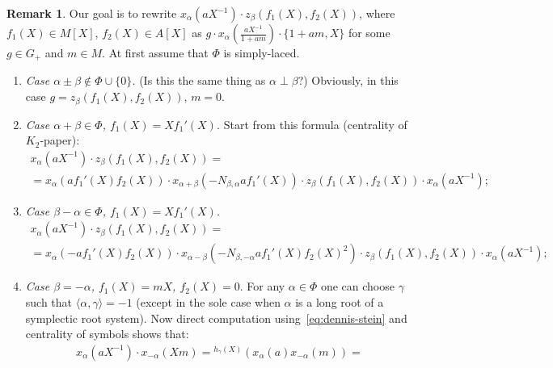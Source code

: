 \documentclass[oneside, 10pt]{amsart}
\theoremstyle{remark}
\theoremstyle{definition}
\newtheorem{rem}[lemma]{Remark}
\begin{document}
\begin{rem} Our goal is to rewrite $x_\alpha(aX^{-1}) \cdot z_\beta(f_1(X), f_2(X))$, where $f_1(X) \in M[X]$, $f_2(X) \in A[X]$ as
 $g \cdot x_\alpha(\frac{aX^{-1}}{1+am}) \cdot \{ 1 + am, X \}$ for some $g \in G_+$
 and $m \in M$. At first assume that $\Phi$ is simply-laced. \end{rem}
\begin{enumerate}
 \item {\it Case $\alpha \pm \beta \not \in \Phi \cup \{ 0\}$.} (Is this the same thing as $\alpha \perp \beta$?)
  Obviously, in this case $g = z_\beta(f_1(X), f_2(X))$, $m=0$.
 \begin{comment} 
 \item {\it Case $\alpha + \beta \in \Phi$, $f_1(X) = Xf_1'(X)$, $f_2(X) = 0$.}
 \[ x_\alpha(aX^{-1}) \cdot x_\beta(Xf_1'(X)) = x_{\alpha+\beta}(af_1'(X))x_\beta(Xf_1'(X)) x_\alpha(aX^{-1}) \]
 \end{comment}
 \item {\it Case $\alpha + \beta \in \Phi$, $f_1(X) = Xf_1'(X)$.}
 Start from this formula (centrality of $K_2$-paper):
 \begin{multline}
 x_\alpha(aX^{-1}) \cdot z_\beta(f_1(X), f_2(X)) = \\ = x_\alpha(af_1'(X)f_2(X)) \cdot x_{\alpha+\beta}(-N_{\beta, \alpha} af_1'(X)) \cdot z_\beta(f_1(X), f_2(X)) \cdot x_\alpha(aX^{-1}); 
 \end{multline}
 \item {\it Case $\beta - \alpha \in \Phi$, $f_1(X) = Xf_1'(X)$.}
 \begin{multline}
  x_{\alpha}(aX^{-1}) \cdot z_\beta(f_1(X), f_2(X)) = \\ = x_{\alpha}(-af_1'(X)f_2(X))\cdot x_{\alpha-\beta}(-N_{\beta,-\alpha} af_1'(X)f_2(X)^2) \cdot z_\beta(f_1(X), f_2(X)) \cdot x_{\alpha}(aX^{-1});
 \end{multline}
 \item {\it Case $\beta = -\alpha$, $f_1(X) = mX$, $f_2(X)=0$}. %
For any $\alpha \in \Phi$ one can choose $\gamma$ such that $\langle \alpha, \gamma \rangle = -1$
(except in the sole case when $\alpha$ is a long root of a symplectic root system).
Now direct computation using~\eqref{eq:dennis-stein} and centrality of symbols shows that:
\begin{multline}
 x_\alpha(aX^{-1}) \cdot x_{-\alpha}(X m) %
 = {}^{h_\gamma(X)}(x_\alpha(a) x_{-\alpha}(m)) = \\

\end{multline}
\end{enumerate}
\end{document}
